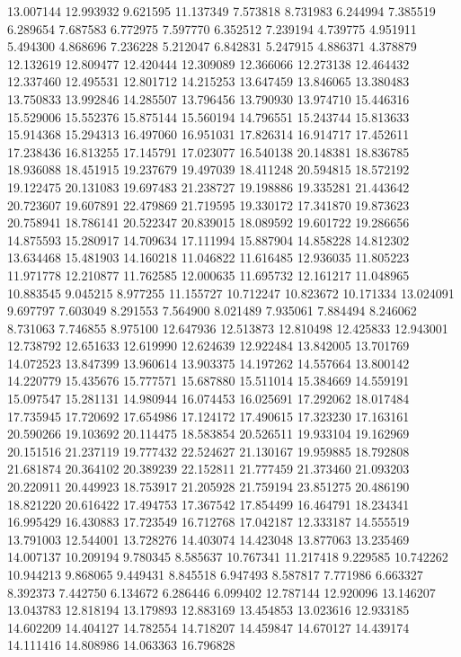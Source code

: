 13.007144
12.993932
9.621595
11.137349
7.573818
8.731983
6.244994
7.385519
6.289654
7.687583
6.772975
7.597770
6.352512
7.239194
4.739775
4.951911
5.494300
4.868696
7.236228
5.212047
6.842831
5.247915
4.886371
4.378879
12.132619
12.809477
12.420444
12.309089
12.366066
12.273138
12.464432
12.337460
12.495531
12.801712
14.215253
13.647459
13.846065
13.380483
13.750833
13.992846
14.285507
13.796456
13.790930
13.974710
15.446316
15.529006
15.552376
15.875144
15.560194
14.796551
15.243744
15.813633
15.914368
15.294313
16.497060
16.951031
17.826314
16.914717
17.452611
17.238436
16.813255
17.145791
17.023077
16.540138
20.148381
18.836785
18.936088
18.451915
19.237679
19.497039
18.411248
20.594815
18.572192
19.122475
20.131083
19.697483
21.238727
19.198886
19.335281
21.443642
20.723607
19.607891
22.479869
21.719595
19.330172
17.341870
19.873623
20.758941
18.786141
20.522347
20.839015
18.089592
19.601722
19.286656
14.875593
15.280917
14.709634
17.111994
15.887904
14.858228
14.812302
13.634468
15.481903
14.160218
11.046822
11.616485
12.936035
11.805223
11.971778
12.210877
11.762585
12.000635
11.695732
12.161217
11.048965
10.883545
9.045215
8.977255
11.155727
10.712247
10.823672
10.171334
13.024091
9.697797
7.603049
8.291553
7.564900
8.021489
7.935061
7.884494
8.246062
8.731063
7.746855
8.975100
12.647936
12.513873
12.810498
12.425833
12.943001
12.738792
12.651633
12.619990
12.624639
12.922484
13.842005
13.701769
14.072523
13.847399
13.960614
13.903375
14.197262
14.557664
13.800142
14.220779
15.435676
15.777571
15.687880
15.511014
15.384669
14.559191
15.097547
15.281131
14.980944
16.074453
16.025691
17.292062
18.017484
17.735945
17.720692
17.654986
17.124172
17.490615
17.323230
17.163161
20.590266
19.103692
20.114475
18.583854
20.526511
19.933104
19.162969
20.151516
21.237119
19.777432
22.524627
21.130167
19.959885
18.792808
21.681874
20.364102
20.389239
22.152811
21.777459
21.373460
21.093203
20.220911
20.449923
18.753917
21.205928
21.759194
23.851275
20.486190
18.821220
20.616422
17.494753
17.367542
17.854499
16.464791
18.234341
16.995429
16.430883
17.723549
16.712768
17.042187
12.333187
14.555519
13.791003
12.544001
13.728276
14.403074
14.423048
13.877063
13.235469
14.007137
10.209194
9.780345
8.585637
10.767341
11.217418
9.229585
10.742262
10.944213
9.868065
9.449431
8.845518
6.947493
8.587817
7.771986
6.663327
8.392373
7.442750
6.134672
6.286446
6.099402
12.787144
12.920096
13.146207
13.043783
12.818194
13.179893
12.883169
13.454853
13.023616
12.933185
14.602209
14.404127
14.782554
14.718207
14.459847
14.670127
14.439174
14.111416
14.808986
14.063363
16.796828

